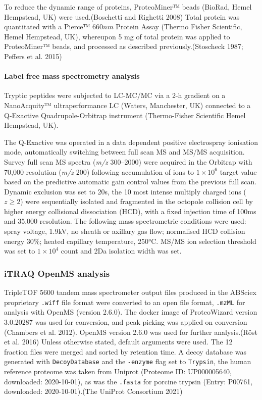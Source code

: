 \documentclass[9pt,lineno]{elife}
\begin{document}
To reduce the dynamic range of proteins, ProteoMiner™ beads (BioRad, Hemel Hempstead, UK) were used.(Boschetti and Righetti 2008) Total protein was quantitated with a Pierce™ \(660 nm\) Protein Assay (Thermo Fisher Scientific, Hemel Hempstead, UK), whereupon 5 mg of total protein was applied to ProteoMiner™ beads, and processed as described previously.(Stoscheck 1987; Peffers et al. 2015)

\hypertarget{label-free-mass-spectrometry-analysis}{%
\paragraph{Label free mass spectrometry analysis}\label{label-free-mass-spectrometry-analysis}}

Tryptic peptides were subjected to LC-MC/MC via a 2-h gradient on a NanoAcquity™ ultraperformance LC (Waters, Manchester, UK) connected to a Q-Exactive Quadrupole-Orbitrap instrument (Thermo-Fisher Scientific Hemel Hempstead, UK).

The Q-Exactive was operated in a data dependent positive electrospray ionisation mode, automatically switching between full scan MS and MS/MS acquisition.
Survey full scan MS spectra (\emph{m/z} 300--2000) were acquired in the Orbitrap with 70,000 resolution (\emph{m/z} 200) following accumulation of ions to \(1\times 10^6\) target value based on the predictive automatic gain control values from the previous full scan.
Dynamic exclusion was set to 20s, the 10 most intense multiply charged ions (\(z \geq 2\)) were sequentially isolated and fragmented in the octopole collision cell by higher energy collisional dissociation (HCD), with a fixed injection time of 100ms and 35,000 resolution.
The following mass spectrometric conditions were used: spray voltage, 1.9kV, no sheath or axillary gas flow; normalised HCD collision energy 30\%; heated capillary temperature, 250°C.
MS/MS ion selection threshold was set to \(1\times 10^4\) count and 2Da isolation width was set.

\hypertarget{openms-chap3}{%
\subsubsection{iTRAQ OpenMS analysis}\label{openms-chap3}}

TripleTOF 5600 tandem mass spectrometer output files produced in the ABSciex proprietary \texttt{.wiff} file format were converted to an open file format, \texttt{.mzML} for analysis with OpenMS (version 2.6.0).
The docker image of ProteoWizard version 3.0.20287 was used for conversion, and peak picking was applied on conversion (Chambers et al. 2012).
OpenMS version 2.6.0 was used for further analysis.(Röst et al. 2016) Unless otherwise stated, default arguments were used.
The 12 fraction files were merged and sorted by retention time.
A decoy database was generated with \texttt{DecoyDatabase} and the \texttt{-enzyme} flag set to \texttt{Trypsin}, the human reference proteome was taken from Uniprot (Proteome ID: UP000005640, downloaded: 2020-10-01), as was the \texttt{.fasta} for porcine trypsin (Entry: P00761, downloaded: 2020-10-01).(The UniProt Consortium 2021)
\end{document}

